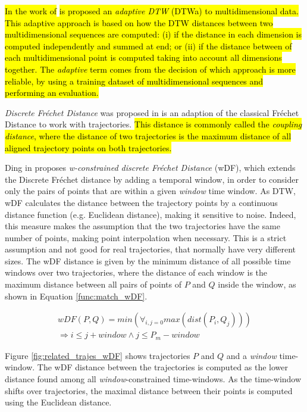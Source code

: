 \hl{In the work of }\cite{Shokoohi-Yekta2017}\hl{ is proposed an \emph{adaptive DTW} (DTWa) to multidimensional data. This adaptive approach is based on how the DTW distances between two multidimensional sequences are computed: (i) if the distance in each dimension is computed independently and summed at end; or (ii) if the distance between of each multidimensional point is computed taking into account all dimensions together. The \emph{adaptive} term comes from the decision of which approach is more reliable, by using a training dataset of multidimensional sequences and performing an evaluation.}

\emph{Discrete Fr{\'e}chet Distance} was proposed in \cite{eiter1994computing} is an adaption of the classical Fr{\'e}chet Distance \cite{Frechet1906} to work with trajectories. \hl{This distance is commonly called the \emph{coupling distance}, where the distance of two trajectories is the maximum distance of all aligned trajectory points on both trajectories.}

Ding in \cite{Ding:2008:ESJ:1440463.1440989} proposes \emph{w-constrained discrete Fr{\'e}chet Distance} (wDF), which extends the Discrete Fr{\'e}chet distance \cite{eiter1994computing} by adding a temporal window, in order to consider only the pairs of points that are within a given \emph{window} time window. {As DTW, wDF calculates the distance between the trajectory points by a continuous distance function (e.g. Euclidean distance), making it sensitive to noise}. Indeed, this measure makes the assumption that the two trajectories have the same number of points, making point interpolation when necessary. This is a strict assumption and not good for real trajectories, that normally have very different sizes. The wDF distance is given by the minimum distance of all possible time windows over two trajectories, where the distance of each window is the maximum distance between all pairs of points of $P$ and $Q$ inside the window, as shown in Equation \ref{func:match_wDF}.

\begin{equation}
\begin{split}
\label{func:match_wDF}
  wDF(P, Q) = min(\forall_{i,j=0}max(dist(P_i, Q_j))) \\
  \Rightarrow i \leq j + window \land j \leq P_{m} - window
\end{split}
\end{equation}

Figure \ref{fig:related_trajes_wDF} shows trajectories $P$ and $Q$ and a \emph{window} time-window. The wDF distance between the trajectories is computed as the lower distance found among all \emph{window}-constrained time-windows. As the time-window shifts over trajectories, the maximal distance between their points is computed using the Euclidean distance.

